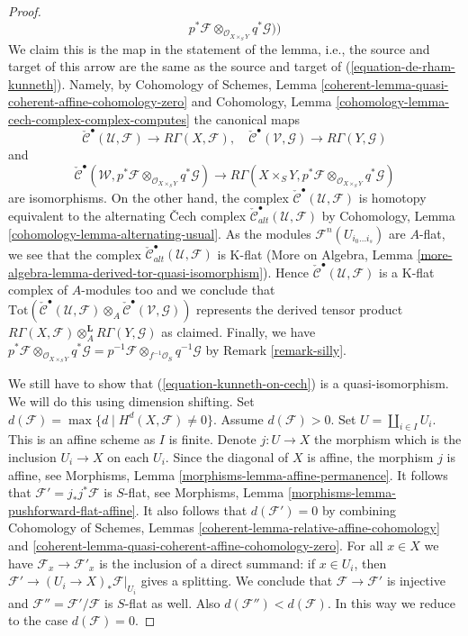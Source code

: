\begin{proof}
\begin{equation}
p^*\mathcal{F}
\otimes_{\mathcal{O}_{X \times_S Y}}
q^*\mathcal{G}))
\end{equation}
We claim this is the map in the statement of the lemma, i.e.,
the source and target of this arrow are the same as the source
and target of (\ref{equation-de-rham-kunneth}). Namely, by
Cohomology of Schemes, Lemma
\ref{coherent-lemma-quasi-coherent-affine-cohomology-zero}
and
Cohomology, Lemma \ref{cohomology-lemma-cech-complex-complex-computes}
the canonical maps
$$
\check{\mathcal{C}}^\bullet(\mathcal{U}, \mathcal{F})
\to
R\Gamma(X, \mathcal{F}),
\quad
\check{\mathcal{C}}^\bullet(\mathcal{V}, \mathcal{G})
\to
R\Gamma(Y, \mathcal{G})
$$
and
$$
\check{\mathcal{C}}^\bullet(\mathcal{W},
p^*\mathcal{F} \otimes_{\mathcal{O}_{X \times_S Y}} q^*\mathcal{G})
\to
R\Gamma(X \times_S Y,
p^*\mathcal{F} \otimes_{\mathcal{O}_{X \times_S Y}}
q^*\mathcal{G})
$$
are isomorphisms. On the other hand, the complex
$\check{\mathcal{C}}^\bullet(\mathcal{U}, \mathcal{F})$
is homotopy equivalent to the alternating {\v C}ech complex
$\check{\mathcal{C}}_{alt}^\bullet(\mathcal{U}, \mathcal{F})$
by Cohomology, Lemma \ref{cohomology-lemma-alternating-usual}.
As the modules
$\mathcal{F}^n(U_{i_0\ldots i_s})$ are $A$-flat,
we see that the complex
$\check{\mathcal{C}}_{alt}^\bullet(\mathcal{U}, \mathcal{F})$
is K-flat (More on Algebra, Lemma
\ref{more-algebra-lemma-derived-tor-quasi-isomorphism}). Hence
$\check{\mathcal{C}}^\bullet(\mathcal{U}, \mathcal{F})$
is a K-flat complex of $A$-modules too and we conclude that
$\text{Tot}(
\check{\mathcal{C}}^\bullet(\mathcal{U}, \mathcal{F})
\otimes_A
\check{\mathcal{C}}^\bullet(\mathcal{V}, \mathcal{G}))$
represents the derived tensor product
$R\Gamma(X, \mathcal{F}) \otimes_A^\mathbf{L} R\Gamma(Y, \mathcal{G})$
as claimed. Finally, we have
$p^*\mathcal{F} \otimes_{\mathcal{O}_{X \times_S Y}} q^*\mathcal{G} =
p^{-1}\mathcal{F} \otimes_{f^{-1}\mathcal{O}_S} q^{-1}\mathcal{G}$
by Remark \ref{remark-silly}.

\medskip\noindent
We still have to show that (\ref{equation-kunneth-on-cech})
is a quasi-isomorphism. We will do this using dimension shifting.
Set $d(\mathcal{F}) = \max \{d \mid H^d(X, \mathcal{F}) \not = 0\}$.
Assume $d(\mathcal{F}) > 0$. Set $U = \coprod\nolimits_{i \in I} U_i$.
This is an affine scheme as $I$ is finite. Denote
$j : U \to X$ the morphism which is the inclusion $U_i \to X$
on each $U_i$. Since the diagonal of $X$ is affine, the morphism
$j$ is affine, see
Morphisms, Lemma \ref{morphisms-lemma-affine-permanence}.
It follows that $\mathcal{F}' = j_*j^*\mathcal{F}$ is $S$-flat, see
Morphisms, Lemma \ref{morphisms-lemma-pushforward-flat-affine}.
It also follows that $d(\mathcal{F}') = 0$ by combining
Cohomology of Schemes, Lemmas
\ref{coherent-lemma-relative-affine-cohomology} and
\ref{coherent-lemma-quasi-coherent-affine-cohomology-zero}.
For all $x \in X$ we have $\mathcal{F}_x  \to \mathcal{F}'_x$
is the inclusion of a direct summand: if $x \in U_i$,
then $\mathcal{F}' \to (U_i \to X)_*\mathcal{F}|_{U_i}$
gives a splitting. We conclude that
$\mathcal{F} \to \mathcal{F}'$ is injective and
$\mathcal{F}'' = \mathcal{F}'/\mathcal{F}$
is $S$-flat as well. Also $d(\mathcal{F}'') < d(\mathcal{F})$.
In this way we reduce to the case $d(\mathcal{F}) = 0$.


\end{proof}
